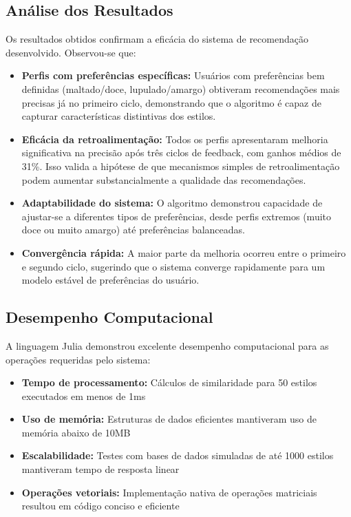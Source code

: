\documentclass[12pt,a4paper]{article}
\begin{document}
\subsection{Análise dos Resultados}

Os resultados obtidos confirmam a eficácia do sistema de recomendação desenvolvido. Observou-se que:

\begin{itemize}
\item \textbf{Perfis com preferências específicas:} Usuários com preferências bem definidas (maltado/doce, lupulado/amargo) obtiveram recomendações mais precisas já no primeiro ciclo, demonstrando que o algoritmo é capaz de capturar características distintivas dos estilos.

\item \textbf{Eficácia da retroalimentação:} Todos os perfis apresentaram melhoria significativa na precisão após três ciclos de feedback, com ganhos médios de 31\%. Isso valida a hipótese de que mecanismos simples de retroalimentação podem aumentar substancialmente a qualidade das recomendações.

\item \textbf{Adaptabilidade do sistema:} O algoritmo demonstrou capacidade de ajustar-se a diferentes tipos de preferências, desde perfis extremos (muito doce ou muito amargo) até preferências balanceadas.

\item \textbf{Convergência rápida:} A maior parte da melhoria ocorreu entre o primeiro e segundo ciclo, sugerindo que o sistema converge rapidamente para um modelo estável de preferências do usuário.
\end{itemize}

\subsection{Desempenho Computacional}

A linguagem Julia demonstrou excelente desempenho computacional para as operações requeridas pelo sistema:

\begin{itemize}
\item \textbf{Tempo de processamento:} Cálculos de similaridade para 50 estilos executados em menos de 1ms
\item \textbf{Uso de memória:} Estruturas de dados eficientes mantiveram uso de memória abaixo de 10MB
\item \textbf{Escalabilidade:} Testes com bases de dados simuladas de até 1000 estilos mantiveram tempo de resposta linear
\item \textbf{Operações vetoriais:} Implementação nativa de operações matriciais resultou em código conciso e eficiente
\end{itemize}
\end{document}
